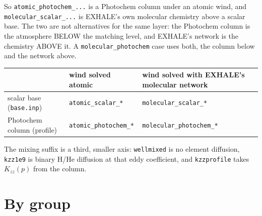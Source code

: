 \documentclass[11pt]{my_memo}
\begin{document}
\noindent
So \texttt{atomic\_photochem\_...} is a Photochem column under an atomic
wind, and \texttt{molecular\_scalar\_...} is EXHALE's own molecular chemistry
above a scalar base. The two are not alternatives for the same layer: the
Photochem column is the atmosphere BELOW the matching level, and EXHALE's
network is the chemistry ABOVE it. A \texttt{molecular\_photochem} case uses
both, the column below and the network above.

\begin{center}
\footnotesize
\begin{tabular}{@{}l l l@{}}
\toprule
 & wind solved atomic & wind solved with EXHALE's molecular network\\
\midrule
scalar base (\texttt{base.inp}) & \texttt{atomic\_scalar\_*} & \texttt{molecular\_scalar\_*}\\
Photochem column (profile) & \texttt{atomic\_photochem\_*} & \texttt{molecular\_photochem\_*}\\
\bottomrule
\end{tabular}
\end{center}

\noindent
The mixing suffix is a third, smaller axis: \texttt{wellmixed} is no element
diffusion, \texttt{kzz1e9} is binary H/He diffusion at that eddy coefficient,
and \texttt{kzzprofile} takes $K_{zz}(p)$ from the column.

\section{By group}
\end{document}
